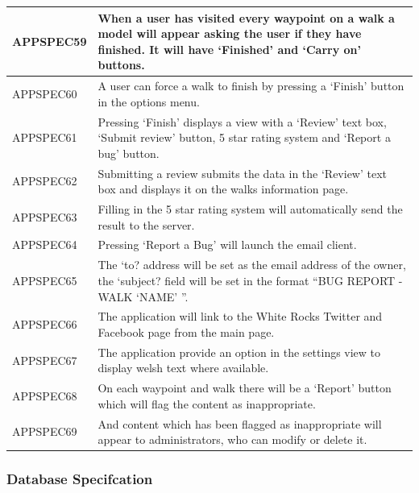 \documentclass[11pt,a4paper]{article}
\begin{document}
\begin{longtable}{|p{2.5cm}p{13cm}|}
APPSPEC59 & When a user has visited every waypoint on a walk a model will appear asking the user if they have finished. It will have `Finished' and `Carry on' buttons. \\ \hline
APPSPEC60 & A user can force a walk to finish by pressing a `Finish' button in the options menu. \\ \hline
APPSPEC61 & Pressing `Finish' displays a view with a `Review' text box, `Submit review' button, 5 star rating system and `Report a bug' button. \\ \hline
APPSPEC62 & Submitting a review submits the data in the `Review' text box and displays it on the walks information page.\\ \hline
APPSPEC63 & Filling in the 5 star rating system will automatically send the result to the server.\\ \hline
APPSPEC64 & Pressing `Report a Bug' will launch the email client. \\ \hline
APPSPEC65 & The `to? address will be set as the email address of the owner, the `subject? field will be set in the format ``BUG REPORT - WALK `NAME' ''.\\ \hline
APPSPEC66 & The application will link to the White Rocks Twitter and Facebook page from the main page.\\ \hline
APPSPEC67 & The application provide an option in the settings view to display welsh text where available. \\ \hline
APPSPEC68 & On each waypoint and walk there will be a `Report' button which will flag the content as inappropriate. \\ \hline
APPSPEC69 & And content which has been flagged as inappropriate will appear to administrators, who can modify or delete it. \\ \hline
\end{longtable}

\subsubsection{Database Specifcation}
\end{document}
